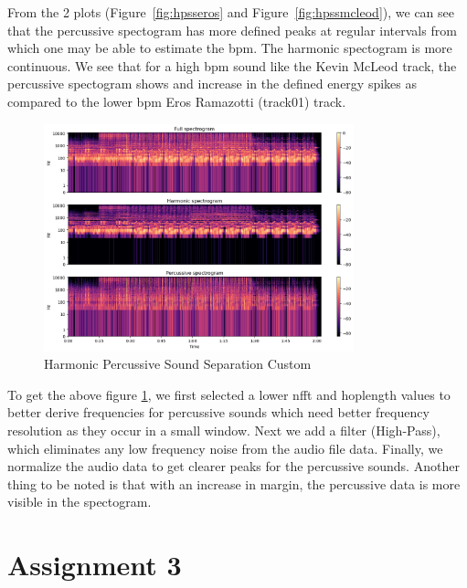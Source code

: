 \documentclass[a4paper, 12pt]{article}
\begin{document}
From the 2 plots (Figure~\ref{fig:hpsseros} and Figure~\ref{fig:hpssmcleod}), we can see that the percussive spectogram has more defined peaks at regular intervals from which one may be able to estimate the bpm. The 
harmonic spectogram is more continuous. We see that for a high bpm sound like the Kevin McLeod track, the percussive spectogram shows and increase in the 
defined energy spikes as compared to the lower bpm Eros Ramazotti (track01) track.
\newline

\begin{figure}[h!]
    \centering
    \includegraphics[width=0.8\textwidth]{./images/hprss-mcleod-output-custom.png}
    \caption{Harmonic Percussive Sound Separation Custom}
\label{fig:hpsstrack02}
\end{figure}
To get the above figure \ref{fig:hpsstrack02}, we first selected a lower nfft and hoplength values to better derive frequencies for percussive sounds which need better frequency resolution
as they occur in a small window. Next we add a filter (High-Pass), which eliminates any low frequency noise from the audio file data. Finally, we 
normalize the audio data to get clearer peaks for the percussive sounds. Another thing to be noted is that with an increase in margin, the percussive data is more 
visible in the spectogram.

\section*{Assignment 3}
\end{document}
